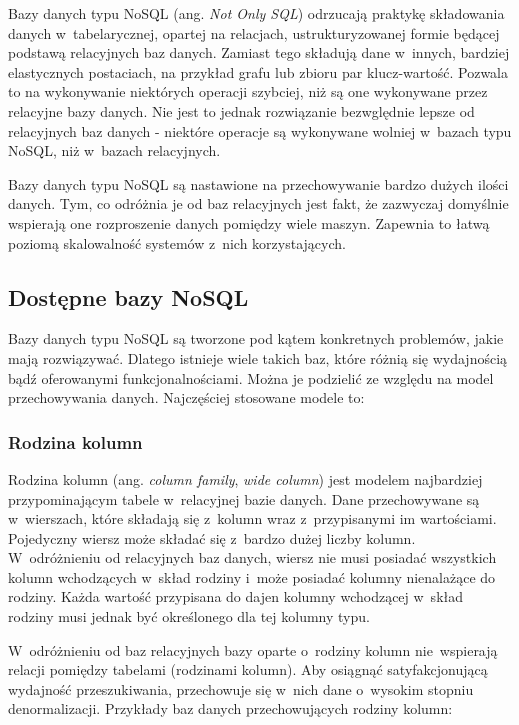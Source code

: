Bazy danych typu NoSQL (ang. \emph{Not Only SQL}) odrzucają praktykę składowania danych w~tabelarycznej, opartej na relacjach, ustrukturyzowanej formie będącej podstawą relacyjnych baz danych.
Zamiast tego składują dane w~innych, bardziej elastycznych postaciach, na przykład grafu lub zbioru par klucz-wartość.
Pozwala to na wykonywanie niektórych operacji szybciej, niż są one wykonywane przez relacyjne bazy danych.
Nie jest to jednak rozwiązanie bezwględnie lepsze od relacyjnych baz danych - niektóre operacje są wykonywane wolniej w~bazach typu NoSQL, niż w~bazach relacyjnych.

Bazy danych typu NoSQL są nastawione na przechowywanie bardzo dużych ilości danych.
Tym, co odróżnia je od baz relacyjnych jest fakt, że zazwyczaj domyślnie wspierają one rozproszenie danych pomiędzy wiele maszyn.
Zapewnia to łatwą poziomą skalowalność systemów z~nich korzystających.


\subsection{Dostępne bazy NoSQL}

Bazy danych typu NoSQL są tworzone pod kątem konkretnych problemów, jakie mają rozwiązywać.
Dlatego istnieje wiele takich baz, które różnią się wydajnością bądź oferowanymi funkcjonalnościami.
Można je podzielić ze względu na model przechowywania danych.
Najczęściej stosowane modele to:

\subsubsection{Rodzina kolumn} \label{sec:column_family}

Rodzina kolumn (ang. \emph{column family}, \emph{wide column}) jest modelem najbardziej przypominającym tabele w~relacyjnej bazie danych.
Dane przechowywane są w~wierszach, które składają się z~kolumn wraz z~przypisanymi im wartościami.
Pojedyczny wiersz może składać się z~bardzo dużej liczby kolumn.
W~odróżnieniu od relacyjnych baz danych, wiersz nie musi posiadać wszystkich kolumn wchodzących w~skład rodziny i~może posiadać kolumny nienalażące do rodziny.
Każda wartość przypisana do dajen kolumny wchodzącej w~skład rodziny musi jednak być określonego dla tej kolumny typu.

W~odróżnieniu od baz relacyjnych bazy oparte o~rodziny kolumn nie~wspierają relacji pomiędzy tabelami (rodzinami kolumn).
Aby osiągnąć satyfakcjonującą wydajność przeszukiwania, przechowuje się w~nich dane o~wysokim stopniu denormalizacji.
Przykłady baz danych przechowujących rodziny kolumn:

